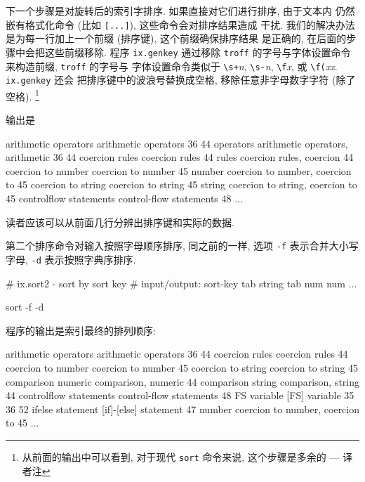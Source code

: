 下一个步骤是对旋转后的索引字排序. 如果直接对它们进行排序, 由于文本内
仍然嵌有格式化命令 (比如 \texttt{[...]}), 这些命令会对排序结果造成
干扰. 我们的解决办法是为每一行加上一个前缀 (排序键), 这个前缀确保排序结果
是正确的, 在后面的步骤中会把这些前缀移除. 程序 \texttt{ix.genkey} 通过移除 
\texttt{troff} 的字号与字体设置命令来构造前缀, \texttt{troff} 的字号与 
字体设置命令类似于 \verb'\s+'\textit{n}, \verb'\s-'\textit{n},
\verb'\f'\textit{x}, 或 \verb'\f('\textit{xx}. \texttt{ix.genkey} 还会
把排序键中的波浪号替换成空格, 移除任意非字母数字字符 (除了空格).
\footnote{从前面的输出中可以看到, 对于现代 \texttt{sort} 命令来说,
这个步骤是多余的 --- 译者注}
输出是
\begin{awkcode}
    arithmetic operators        arithmetic operators    36 44
    operators arithmetic        operators, arithmetic   36 44
    coercion rules      coercion rules  44
    rules coercion      rules, coercion 44
    coercion to number  coercion to number      45
    number coercion to  number, coercion to     45
    coercion to string  coercion to string      45
    string coercion to  string, coercion to     45
    controlflow statements      control-flow statements 48
    ...
\end{awkcode}
读者应该可以从前面几行分辨出排序键和实际的数据.

第二个排序命令对输入按照字母顺序排序, 同之前的一样, 选项 \texttt{-f}
表示合并大小写字母, \texttt{-d} 表示按照字典序排序.
\begin{awkcode}
    # ix.sort2 - sort by sort key
    #     input/output: sort-key tab string tab num num ...

    sort -f -d
\end{awkcode}
程序的输出是索引最终的排列顺序:
\begin{awkcode}
    arithmetic operators        arithmetic operators    36 44
    coercion rules      coercion rules  44
    coercion to number  coercion to number      45
    coercion to string  coercion to string      45
    comparison numeric  comparison, numeric     44
    comparison string   comparison, string      44
    controlflow statements      control-flow statements 48
    FS variable [FS] variable   35 36 52
    ifelse statement    [if]-[else] statement   47
    number coercion to  number, coercion to     45
    ...
\end{awkcode}

